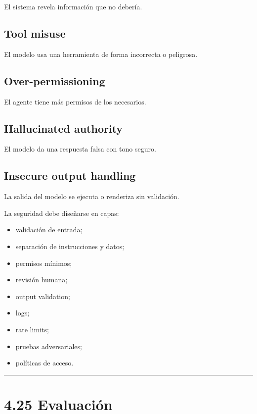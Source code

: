 El sistema revela información que no debería.

\subsection{Tool misuse}\label{tool-misuse}

El modelo usa una herramienta de forma incorrecta o peligrosa.

\subsection{Over-permissioning}\label{over-permissioning}

El agente tiene más permisos de los necesarios.

\subsection{Hallucinated authority}\label{hallucinated-authority}

El modelo da una respuesta falsa con tono seguro.

\subsection{Insecure output handling}\label{insecure-output-handling}

La salida del modelo se ejecuta o renderiza sin validación.

La seguridad debe diseñarse en capas:

\begin{itemize}
\tightlist
\item
  validación de entrada;
\item
  separación de instrucciones y datos;
\item
  permisos mínimos;
\item
  revisión humana;
\item
  output validation;
\item
  logs;
\item
  rate limits;
\item
  pruebas adversariales;
\item
  políticas de acceso.
\end{itemize}

\begin{center}\rule{0.5\linewidth}{0.5pt}\end{center}

\section{4.25 Evaluación}\label{evaluaciuxf3n-1}

